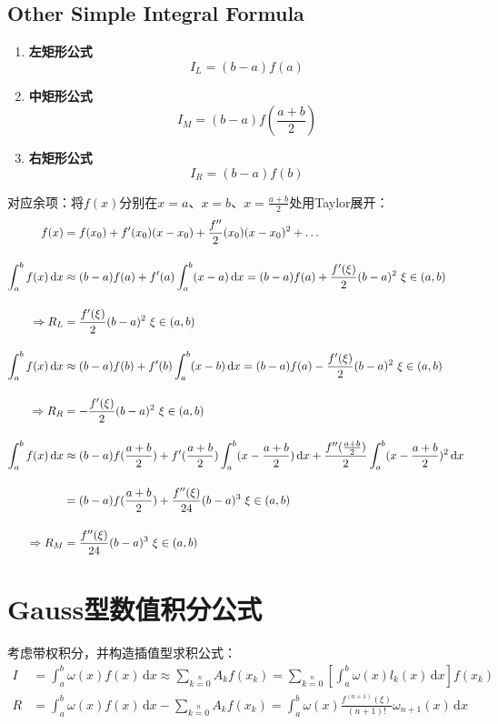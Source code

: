 \newpage
\subsection{Other Simple Integral Formula}
\begin{enumerate}
\item \textbf{左矩形公式}
$$
I_L = (b-a)f(a)
$$
\item \textbf{中矩形公式}
$$
I_M = (b-a)f(\frac{a+b}{2})
$$
\item \textbf{右矩形公式}
$$
I_R = (b-a)f(b)
$$
\end{enumerate}

对应余项：将$f(x)$分别在$x=a$、$x=b$、$\displaystyle{x=\frac{a+b}{2}}$处用Taylor展开：
\begin{align}
f(x) &= f(x_0) + f^{\prime}(x_0)(x-x_0) + \frac{f^{\prime \prime}}{2}(x_0)(x-x_0)^2 + \dots \notag \\[4mm]
\int_a^bf(x)\,\mathrm{d}x &\approx (b-a)f(a) + f^{\prime}(a) \int_a^b(x-a)\,\mathrm{d}x = (b-a)f(a) + \frac{f^{\prime}(\xi)}{2}(b-a)^2 \ \xi \in (a,b)\notag \\[4mm]
\Rightarrow R_L &= \frac{f^{\prime}(\xi)}{2}(b-a)^2 \ \xi \in (a,b)\notag \\[4mm]
\int_a^bf(x)\,\mathrm{d}x &\approx (b-a)f(b) + f^{\prime}(b) \int_a^b(x-b)\,\mathrm{d}x = (b-a)f(a) - \frac{f^{\prime}(\xi)}{2}(b-a)^2 \ \xi \in (a,b)\notag \\[4mm]
\Rightarrow R_R&= - \frac{f^{\prime}(\xi)}{2}(b-a)^2 \ \xi \in (a,b)\notag \\[4mm]
\int_a^bf(x)\,\mathrm{d}x &\approx (b-a)f(\frac{a+b}{2}) + f^{\prime}(\frac{a+b}{2}) \int_a^b(x-\frac{a+b}{2})\,\mathrm{d}x + \frac{f^{\prime \prime}(\frac{a+b}{2})}{2}\int_a^b (x-\frac{a+b}{2})^2 \,\mathrm{d}x\notag \\[4mm]
&= (b-a)f(\frac{a+b}{2}) + \frac{f^{\prime \prime}(\xi)}{24}(b-a)^3\  \xi \in (a,b)\notag \\[4mm]
\Rightarrow R_M &= \frac{f^{\prime \prime}(\xi)}{24}(b-a)^3 \ \xi \in (a,b)\notag
\end{align}


\newpage
\section{Gauss型数值积分公式}
考虑带权积分，并构造插值型求积公式：
\begin{align}
I &= \int_a^b \omega(x)f(x)\,\mathrm{d}x \approx \sum\limits_{k=0}\limits^n A_k f(x_k) = \sum\limits_{k=0}\limits^n [\int_a^b\omega(x) l_k(x)\,\mathrm{d}x] f(x_k)
\\[3mm]
R &= \int_a^b \omega(x)f(x)\,\mathrm{d}x-\sum\limits_{k=0}\limits^n A_k f(x_k) = \int_a^b \omega(x) \frac{f^{(n+1)}(\xi)}{(n+1)!}\omega_{n+1}(x)\,\mathrm{d}x
\end{align}\label{gauss}

